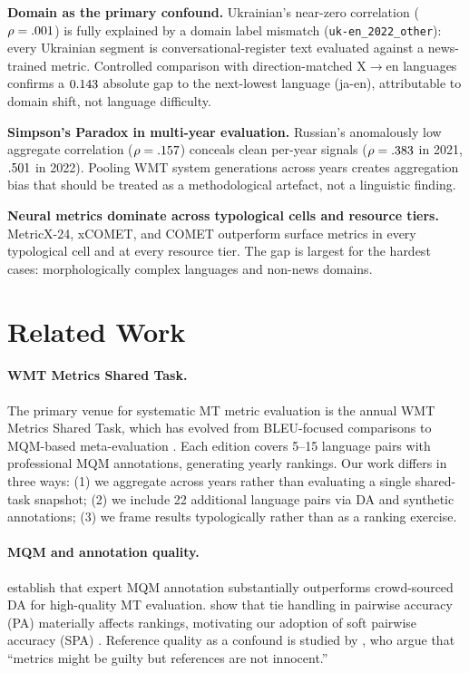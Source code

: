 \documentclass[11pt]{article}
\begin{document}
\textbf{Domain as the primary confound.} Ukrainian's near-zero correlation ($\rho=.001$) is fully explained by a domain label mismatch (\texttt{uk-en\_2022\_other}): every Ukrainian segment is conversational-register text evaluated against a news-trained metric. Controlled comparison with direction-matched X$\to$en languages confirms a $0.143$ absolute gap to the next-lowest language (ja-en), attributable to domain shift, not language difficulty.

\textbf{Simpson's Paradox in multi-year evaluation.} Russian's anomalously low aggregate correlation ($\rho=.157$) conceals clean per-year signals ($\rho=.383$ in 2021, $.501$ in 2022). Pooling WMT system generations across years creates aggregation bias that should be treated as a methodological artefact, not a linguistic finding.

\textbf{Neural metrics dominate across typological cells and resource tiers.} MetricX-24, xCOMET, and COMET outperform surface metrics in every typological cell and at every resource tier. The gap is largest for the hardest cases: morphologically complex languages and non-news domains.

\section{Related Work}
\label{sec:related}

\paragraph{WMT Metrics Shared Task.}
The primary venue for systematic MT metric evaluation is the annual WMT Metrics Shared Task, which has evolved from BLEU-focused comparisons \cite{bojar2017wmt} to MQM-based meta-evaluation \cite{freitag2023results}. Each edition covers 5--15 language pairs with professional MQM annotations, generating yearly rankings. Our work differs in three ways: (1) we aggregate across years rather than evaluating a single shared-task snapshot; (2) we include 22 additional language pairs via DA and synthetic annotations; (3) we frame results typologically rather than as a ranking exercise.

\paragraph{MQM and annotation quality.}
\citet{freitag2021experts} establish that expert MQM annotation substantially outperforms crowd-sourced DA for high-quality MT evaluation. \citet{deutsch2023ties} show that tie handling in pairwise accuracy (PA) materially affects rankings, motivating our adoption of soft pairwise accuracy (SPA) \cite{thompson2024spa}. Reference quality as a confound is studied by \citet{freitag2023results}, who argue that ``metrics might be guilty but references are not innocent.''
\end{document}
